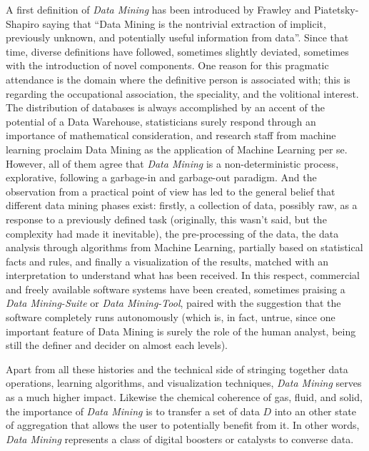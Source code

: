 \documentclass[10pt,latex8]{article}
\begin{document}
A first definition of \textit{Data Mining} has been introduced by Frawley and Piatetsky-Shapiro \cite{frawley} saying that ``Data Mining is the nontrivial extraction of implicit, previously unknown, and potentially useful information from data''. Since that time, diverse definitions have followed, sometimes slightly deviated, sometimes with the introduction of novel components. One reason for this pragmatic attendance is the domain where the definitive person is associated with; this is regarding the occupational association, the speciality, and the volitional interest. The distribution of databases is always accomplished by an accent of the potential of a Data Warehouse, statisticians surely respond through an importance of mathematical consideration, and research staff from machine learning proclaim Data Mining as the application of Machine Learning per se. However, all of them agree that \textit{Data Mining} is a non-deterministic process, explorative, following a garbage-in and garbage-out paradigm. And the observation from a practical point of view has led to the general belief that different data mining phases exist: firstly, a collection of data, possibly raw, as a response to a previously defined task (originally, this wasn't said, but the complexity had made it inevitable), the pre-processing of the data, the data analysis through algorithms from Machine Learning, partially based on statistical facts and rules, and finally a visualization of the results, matched with an interpretation to understand what has been received. In this respect, commercial and freely available software systems have been created, sometimes praising a \textit{Data Mining-Suite} or \textit{Data Mining-Tool}, paired with the suggestion that the software completely runs autonomously (which is, in fact, untrue, since one important feature of Data Mining is surely the role of the human analyst, being still the definer and decider on almost each levels).



Apart from all these histories and the technical side of stringing together data operations, learning algorithms, and visualization techniques, \textit{Data Mining} serves as a much higher impact. Likewise the chemical coherence of gas, fluid, and solid, the importance of \textit{Data Mining} is to transfer a set of data $D$ into an other state of aggregation that allows the user to potentially benefit from it. In other words, \textit{Data Mining} represents a class of digital boosters or catalysts to converse data.
\end{document}
